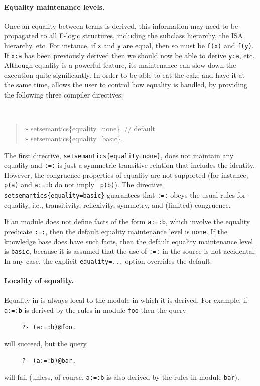 \documentclass[11pt]{article}
\newcommand{\ERGO}{\mbox{\smaller{\ensuremath{\cal{E}}\smaller{{\sc{RGO}}}}}\xspace}
\newcommand{\FLSYSTEM}{\ERGO}
\newcommand{\fl}{\mbox{F-logic}\xspace}
\begin{document}
\paragraph{Equality maintenance levels.}
Once an equality between terms is derived, this information may need to be
propagated to all \fl 
structures, including the subclass hierarchy, the ISA hierarchy, etc.
For instance, if {\tt x} and {\tt y} are equal, then so must be {\tt f(x)}
and {\tt f(y)}. If {\tt x:a} has been previously derived then we should now
be able to derive {\tt y:a}, etc. Although equality is a powerful
feature, its maintenance can slow down the execution quite significantly.
In order to be able to eat the cake and have it at the same time, \FLSYSTEM
allows the user to control how equality is handled,
by providing the following three compiler directives:
{\tt
\begin{quote}
:- setsemantics\{equality=none\}.  // default\\
:- setsemantics\{equality=basic\}.
\end{quote}
}

\noindent
The first directive, \mbox{\tt setsemantics\{equality=none\}}, does not
maintain any equality and {\tt :=:} is just a symmetric transitive relation
that includes the identity. However,
the congruence properties of equality are not
supported (for instance, {\tt p(a)} and {\tt a:=:b} do not imply {\tt
  p(b)}). The directive
\mbox{\tt setsemantics\{equality=basic\}} guarantees that {\tt :=:} obeys the
usual rules for equality, i.e., transitivity, reflexivity,
symmetry, and (limited) congruence.

If an \FLSYSTEM module does not define facts of the form {\tt a:=:b}, which
involve the equality predicate {\tt :=:}, then the default equality
maintenance level is {\tt none}. If the knowledge base does have such facts,
then the default equality maintenance level is {\tt basic}, because it is
assumed that the use of {\tt :=:} in the source is not accidental.
In any case, the explicit {\tt equality=...} option overrides the default.

\paragraph{Locality of equality.}
Equality in \FLSYSTEM is always local to the module in which it is derived.
For example, if {\tt a:=:b} is derived by the rules in module {\tt foo}
then the query
\begin{verbatim}
     ?- (a:=:b)@foo.  
\end{verbatim}
will succeed, but the query
\begin{verbatim}
     ?- (a:=:b)@bar.  
\end{verbatim}
will fail (unless, of course, {\tt a:=:b} is also derived by the rules in
module {\tt bar}).
\end{document}
